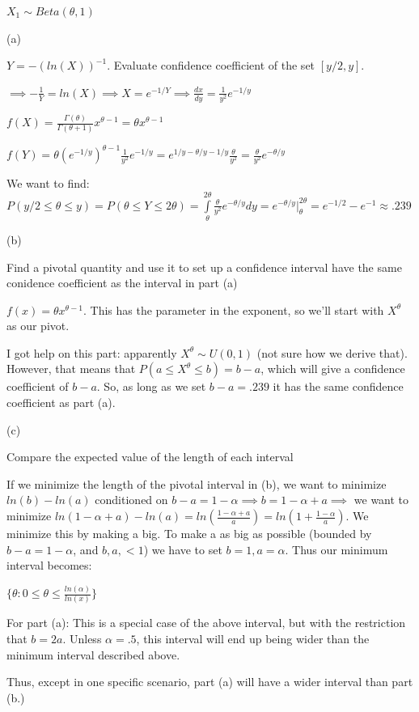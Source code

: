 \documentclass{article}
\let\Oldint=\int
\renewcommand{\int}{\Oldint\limits}
\begin{document}
$X_1 \sim Beta(\theta,1)$

(a)

$Y = -(ln(X))^{-1}$. Evaluate confidence coefficient of the set $[y/2, y]$.

$\implies -\frac{1}{Y} = ln(X) \implies X = e^{-1/Y} \implies \frac{dx}{dy} = \frac{1}{y^2}e^{-1/y}$

$f(X) = \frac{\Gamma(\theta)}{\Gamma(\theta + 1)}x^{\theta-1} = \theta x^{\theta-1}$

$f(Y) = \theta (e^{-1/y})^{\theta-1}\frac{1}{y^2}e^{-1/y} = e^{1/y - \theta/y - 1/y}\frac{\theta}{y^2} = \frac{\theta}{y^2}e^{-\theta/y}$

We want to find: $P(y/2 \le \theta \le y) = P(\theta \le Y \le 2\theta) = \int_{\theta}^{2 \theta} \frac{\theta}{y^2}e^{-\theta/y} dy = e^{-\theta/y}|_{\theta}^{2\theta} = e^{-1/2}- e^{-1} \approx .239$

(b) 

Find a pivotal quantity and use it to set up a confidence interval have the same conidence coefficient as the interval in part (a)

$f(x) = \theta x^{\theta-1}$. This has the parameter in the exponent, so we'll start with $X^\theta$ as our pivot. 

I got help on this part: apparently $X^{\theta} \sim U(0,1)$ (not sure how we derive that). However, that means that $P(a \le X^\theta \le b) = b-a$, which will give a confidence coefficient of $b-a$. So, as long as we set $b-a = .239$ it has the same confidence coefficient as part (a). 

(c)

Compare the expected value of the length of each interval

If we minimize the length of the pivotal interval in (b), we want to minimize $ln(b)-ln(a)$ conditioned on $b - a = 1-\alpha \implies b = 1-\alpha + a \implies$ we want to minimize $ln(1-\alpha+a) - ln(a) = ln(\frac{1-\alpha + a}{a}) = ln(1 + \frac{1-\alpha}{a})$. We minimize this by making a big. To make a as big as possible (bounded by $b-a=1-\alpha$, and $b, a, <1$) we have to set $b = 1, a = \alpha$. Thus our minimum interval becomes: 

$\{\theta: 0 \le \theta \le \frac{ln(\alpha)}{ln(x)}\}$

For part (a): This is a special case of the above interval, but with the restriction that $b = 2a$. Unless $\alpha = .5$, this interval will end up being wider than the minimum interval described above. 

Thus, except in one specific scenario, part (a) will have a wider interval than part (b.)
\end{document}
